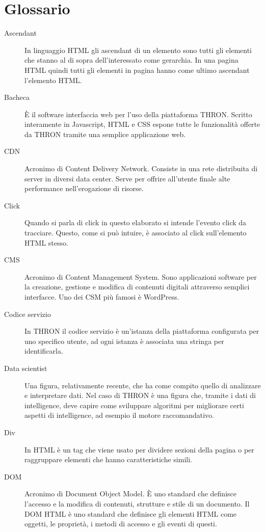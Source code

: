 \documentclass[a4paper, 12pt, twoside, openright]{book}
\begin{document}
\chapter{Glossario}
\begin {description}

\item[Ascendant]
In linguaggio HTML gli ascendant di un elemento sono tutti gli elementi che stanno al di sopra dell'interessato come gerarchia. In una pagina HTML quindi tutti gli elementi in pagina hanno come ultimo ascendant l'elemento HTML.

\item[Bacheca]
\`{E} il software interfaccia web per l'uso della piattaforma THRON. Scritto interamente in Javascript, HTML e CSS espone tutte le funzionalità offerte da THRON tramite una semplice applicazione web.\\

\item[CDN]
Acronimo di Content Delivery Network. Consiste in una rete distribuita di server in diversi data center. Serve per offrire all'utente finale alte performance nell'erogazione di risorse.
\item[Click]
Quando si parla di click in questo elaborato si intende l'evento click da tracciare. Questo, come si può intuire, è associato al click sull'elemento HTML stesso.
\item[CMS]
Acronimo di Content Management System. Sono applicazioni software per la creazione, gestione e modifica di contenuti digitali attraverso semplici interfacce. Uno dei CSM più famosi è WordPress.
\item[Codice servizio]
In THRON il codice servizio è un'istanza della piattaforma configurata per uno specifico utente, ad ogni istanza è associata una stringa per identificarla.

\item[Data scientist]
Una figura, relativamente recente, che ha come compito quello di analizzare e interpretare dati. Nel caso di THRON è una figura che, tramite i dati di intelligence, deve capire come sviluppare algoritmi per migliorare certi aspetti di intelligence, ad esempio il motore raccomandativo.
\item[Div]
In HTML è un tag che viene usato per dividere sezioni della pagina o per raggruppare elementi che hanno caratteristiche simili.
\item[DOM]
Acronimo di Document Object Model. \`{E} uno standard che definisce l'accesso e la modifica di contenuti, strutture e stile di un documento. Il DOM HTML è uno standard che definisce gli elementi HTML come oggetti, le proprietà, i metodi di accesso e gli eventi di questi.


\end{description}
\end{document}

